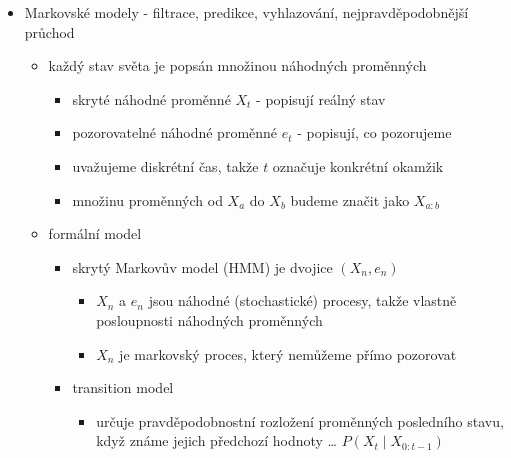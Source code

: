 \begin{itemize}
\begin{itemize}
\begin{itemize}
\begin{itemize}
\begin{itemize}
\end{itemize}
\item např. $\mathrm{at}(a, l, s) \land \mathrm{connected}(l, l') \implies \mathrm{Poss}(\mathrm{go}(a, l, l'), s)$
\end{itemize}
\item vlastnosti dalšího stavu jsou popsány pomocí successor-state axiomů
\begin{itemize}
\item např. $\mathrm{Poss}(a, s) \implies$ $(\mathrm{at}(a,y,\mathrm{Results}(s, a)) \iff a=\mathrm{go}(a,x,y) \lor (\mathrm{at}(a,y,s) \land a\neq \mathrm{go}(a,y,z))$
\end{itemize}
\item plánování se provádí tak, že se zeptáme, zda existuje situace, kde je cílová podmínka pravdivá
\end{itemize}
\end{itemize}
\item Markovské modely - filtrace, predikce, vyhlazování, nejpravděpodobnější průchod
\begin{itemize}
\item každý stav světa je popsán množinou náhodných proměnných
\begin{itemize}
\item skryté náhodné proměnné $X_t$ - popisují reálný stav
\item pozorovatelné náhodné proměnné $e_t$ - popisují, co pozorujeme
\item uvažujeme diskrétní čas, takže $t$ označuje konkrétní okamžik
\item množinu proměnných od $X_a$ do $X_b$ budeme značit jako $X_{a:b}$
\end{itemize}
\item formální model
\begin{itemize}
\item skrytý Markovův model (HMM) je dvojice $(X_n,e_n)$
\begin{itemize}
\item $X_n$ a $e_n$ jsou náhodné (stochastické) procesy, takže vlastně posloupnosti náhodných proměnných
\item $X_n$ je markovský proces, který nemůžeme přímo pozorovat
\end{itemize}
\item transition model
\begin{itemize}
\item určuje pravděpodobnostní rozložení proměnných posledního stavu, když známe jejich předchozí hodnoty \dots{} $P(X_t\mid X_{0:t-1})$

\end{itemize}
\end{itemize}
\end{itemize}
\end{itemize}
